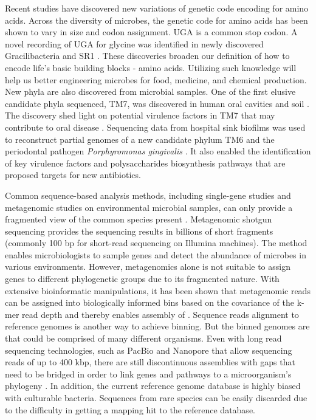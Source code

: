 Recent studies have discovered new variations of genetic code encoding for amino acids. Across the diversity of microbes, the genetic code for amino acids has been shown to vary in size and codon assignment\cite{Prat:2012ef}. UGA is a common stop codon. A novel recording of UGA for glycine was identified in newly discovered Gracilibacteria and SR1 \cite{Rinke:2013bt,Campbell:2016jq}. These discoveries broaden our definition of how to encode life's basic building blocks - amino acids. Utilizing such knowledge will help us better engineering microbes for food, medicine, and chemical production. New phyla are also discovered from microbial samples. One of the first elusive candidate phyla sequenced, TM7, was discovered in human oral cavities \cite{Marcy:2007il} and soil \cite{Podar:2009ks}. The discovery shed light on potential virulence factors in TM7 that may contribute to oral disease \cite{Marcy:2007il}. Sequencing data from hospital sink biofilms was used to reconstruct partial genomes of a new candidate phylum TM6 and the periodontal pathogen \textit{Porphyromonas gingivalis} \cite{McLean:2013ev,McLean:2013kq}. It also enabled the identification of key virulence factors and polysaccharides biosynthesis pathways that are proposed targets for new antibiotics. 


Common sequence-based analysis methods, including single-gene studies and metagenomic studies on environmental microbial samples, can only provide a fragmented view of the common species present \cite{Blainey:2013dp}. Metagenomic shotgun sequencing provides the sequencing results in billions of short fragments (commonly 100 bp for short-read sequencing on Illumina machines). The method enables microbiologists to sample genes and detect the abundance of microbes in various environments. However, metagenomics alone is not suitable to assign genes to different phylogenetic groups due to its fragmented nature. With extensive bioinformatic manipulations, it has been shown that metagenomic reads can be assigned into biologically informed bins based on the covariance of the k-mer read depth and thereby enables assembly of  \cite{Cleary:2015um}. Sequence reads alignment to reference genomes is another way to achieve binning. But the binned genomes are  that could be comprised of many different organisms. Even with long read sequencing technologies, such as PacBio and Nanopore that allow sequencing reads of up to 400 kbp, there are still discontinuous assemblies with gaps that need to be bridged in order to link genes and pathways to a microorganism's phylogeny \cite{Clingenpeel:2015bf}. In addition, the current reference genome database is highly biased with culturable bacteria. Sequences from rare species can be easily discarded due to the difficulty in getting a mapping hit to the reference database.

